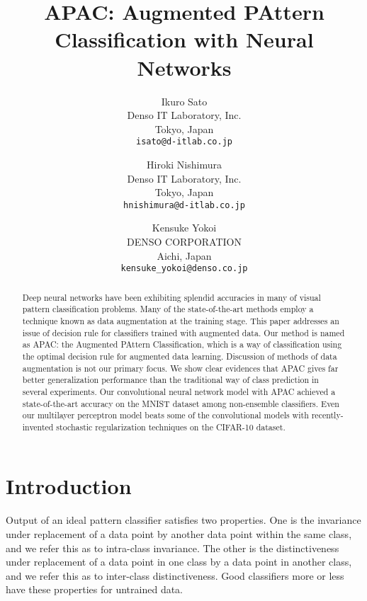 \documentclass[10pt,twocolumn,letterpaper]{article}
\begin{document}
\title{APAC: Augmented PAttern Classification with Neural Networks}

\author{Ikuro Sato\\
Denso IT Laboratory, Inc.\\
Tokyo, Japan\\
{\tt\small isato@d-itlab.co.jp}
\and
Hiroki Nishimura\\
Denso IT Laboratory, Inc.\\
Tokyo, Japan\\
{\tt\small hnishimura@d-itlab.co.jp}
\and
Kensuke Yokoi\\
DENSO CORPORATION\\
Aichi, Japan\\
{\tt\small kensuke\_yokoi@denso.co.jp}
}

\maketitle


\begin{abstract}
Deep neural networks have been exhibiting splendid accuracies in many of visual pattern classification problems.
Many of the state-of-the-art methods employ a technique known as data augmentation at the training stage.
This paper addresses an issue of decision rule for classifiers trained with augmented data.
Our method is named as APAC: the Augmented PAttern Classification, which is a way of classification using
the optimal decision rule for augmented data learning.
Discussion of methods of data augmentation is not our primary focus.
We show clear evidences that APAC gives far better generalization performance than 
the traditional way of class prediction in several experiments.
Our convolutional neural network model with APAC 
achieved a state-of-the-art accuracy on the MNIST dataset among non-ensemble classifiers.
Even our multilayer perceptron model beats some of the convolutional models with recently-invented
stochastic regularization techniques on the CIFAR-10 dataset.
\end{abstract}

\section{Introduction}

Output of an ideal pattern classifier satisfies two properties.
One is the invariance under replacement of a data point by another data point within the same class,
and we refer this as to intra-class invariance.
The other is the distinctiveness under replacement of a data point in one class
by a data point in another class,
and we refer this as to inter-class distinctiveness.
Good classifiers more or less have these properties for untrained data.
\end{document}
